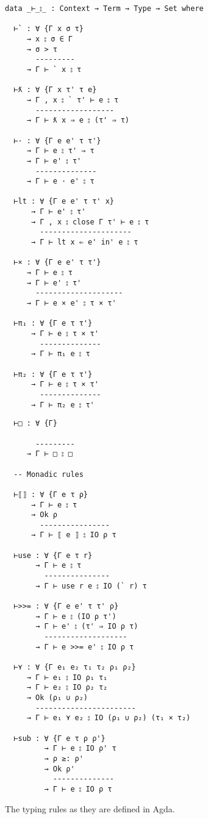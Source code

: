 \begin{listing}
  \begin{multicols}{2}
\begin{verbatim}
data _⊢_⦂_ : Context → Term → Type → Set where

  ⊢` : ∀ {Γ x σ τ}
     → x ⦂ σ ∈ Γ
     → σ > τ
       ---------
     → Γ ⊢ ` x ⦂ τ

  ⊢ƛ : ∀ {Γ x τ' τ e}
     → Γ , x ⦂ ` τ' ⊢ e ⦂ τ
       ------------------
     → Γ ⊢ ƛ x ⇒ e ⦂ (τ' ⇒ τ)

  ⊢· : ∀ {Γ e e' τ τ'}
     → Γ ⊢ e ⦂ τ' ⇒ τ
     → Γ ⊢ e' ⦂ τ'
       --------------
     → Γ ⊢ e · e' ⦂ τ

  ⊢lt : ∀ {Γ e e' τ τ' x}
      → Γ ⊢ e' ⦂ τ'
      → Γ , x ⦂ close Γ τ' ⊢ e ⦂ τ
        ---------------------
      → Γ ⊢ lt x ⇐ e' in' e ⦂ τ

  ⊢× : ∀ {Γ e e' τ τ'}
     → Γ ⊢ e ⦂ τ
     → Γ ⊢ e' ⦂ τ'
       --------------------
     → Γ ⊢ e × e' ⦂ τ × τ'

  ⊢π₁ : ∀ {Γ e τ τ'}
      → Γ ⊢ e ⦂ τ × τ'
        --------------
      → Γ ⊢ π₁ e ⦂ τ

  ⊢π₂ : ∀ {Γ e τ τ'}
      → Γ ⊢ e ⦂ τ × τ'
        --------------
      → Γ ⊢ π₂ e ⦂ τ'
\end{verbatim}
\begin{verbatim}
  ⊢□ : ∀ {Γ}
       
       ---------
     → Γ ⊢ □ ⦂ □

  -- Monadic rules

  ⊢⟦⟧ : ∀ {Γ e τ ρ}
      → Γ ⊢ e ⦂ τ
      → Ok ρ
        ----------------
      → Γ ⊢ ⟦ e ⟧ ⦂ IO ρ τ
      
  ⊢use : ∀ {Γ e τ r}
       → Γ ⊢ e ⦂ τ
         ---------------
       → Γ ⊢ use r e ⦂ IO (` r) τ
  
  ⊢>>= : ∀ {Γ e e' τ τ' ρ}
       → Γ ⊢ e ⦂ (IO ρ τ')
       → Γ ⊢ e' ⦂ (τ' ⇒ IO ρ τ)
         -------------------
       → Γ ⊢ e >>= e' ⦂ IO ρ τ

  ⊢⋎ : ∀ {Γ e₁ e₂ τ₁ τ₂ ρ₁ ρ₂}
     → Γ ⊢ e₁ ⦂ IO ρ₁ τ₁
     → Γ ⊢ e₂ ⦂ IO ρ₂ τ₂
     → Ok (ρ₁ ∪ ρ₂)
       -----------------------
     → Γ ⊢ e₁ ⋎ e₂ ⦂ IO (ρ₁ ∪ ρ₂) (τ₁ × τ₂)

  ⊢sub : ∀ {Γ e τ ρ ρ'}
         → Γ ⊢ e ⦂ IO ρ' τ
         → ρ ≥: ρ'
         → Ok ρ'
           --------------
         → Γ ⊢ e ⦂ IO ρ τ
\end{verbatim}
\end{multicols}
\caption{The typing rules as they are defined in Agda.}\label{lst:typingrules}
\end{listing}

